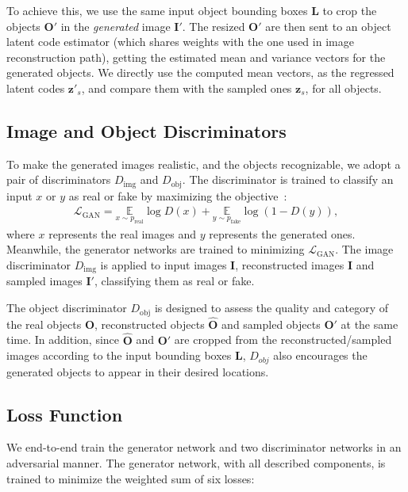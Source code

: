 \documentclass[10pt,twocolumn,letterpaper]{article}
\begin{document}
To achieve this, we use the same input object bounding boxes $\mathbf{L}$ to crop the objects $\mathbf{O}'$ in the {\em generated} image $\mathbf{I}'$. 
The resized $\mathbf{O}'$ are then sent to an object latent code estimator (which shares weights with the one used in image reconstruction path), getting the estimated mean and variance vectors for the generated objects. 
We directly use the computed mean vectors, as the regressed latent codes $\mathbf{z}'_s$, and compare them with the sampled ones $\mathbf{z}_s$, for all objects. 

\subsection{Image and Object Discriminators}
To make the generated images realistic, and the objects recognizable, we adopt a pair of discriminators $D_{\mathrm{img}}$ and $D_{\mathrm{obj}}$.
The discriminator is trained to classify an input $x$ or $y$ as real or fake by maximizing the objective~\cite{Goodfellow2014}:
\begin{align}
	\label{eq:adv_loss}
	\mathcal{L}_\mathrm{GAN} = \underset{x\sim p_\mathrm{real}}{\mathbb{E}}\log D(x)+ \underset{y\sim p_\mathrm{fake}}{\mathbb{E}}\log(1-D(y)),
\end{align}
where $x$ represents the real images and $y$ represents the generated ones.
Meanwhile, the generator networks are trained to minimizing $\mathcal{L}_\mathrm{GAN}$.
The image discriminator $D_{\mathrm{img}}$ is applied to input images $\mathbf{I}$, reconstructed images $\hat{\mathbf{I}}$ and sampled images $\mathbf{I}'$, classifying them as real or fake.


The object discriminator $D_{\mathrm{obj}}$ is designed to assess the quality and category of the real objects $\mathbf{O}$, reconstructed objects $\mathbf{\hat{O}}$ and sampled objects $\mathbf{O}'$ at the same time.
In addition, since $\mathbf{\hat{O}}$ and $\mathbf{O}'$ are cropped from the reconstructed/sampled images according to the input bounding boxes $\mathbf{L}$, $D_{obj}$ also encourages the generated objects to appear in their desired locations. 





\subsection{Loss Function}
We end-to-end train the generator network and two discriminator networks in an adversarial manner. The generator network, with all described components, is trained to minimize the weighted sum of six losses:
\end{document}
